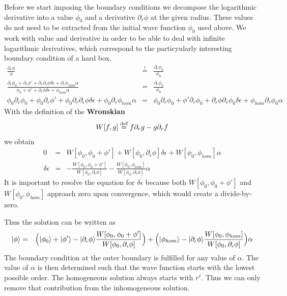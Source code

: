 \documentclass[11pt,a4paper]{report}
\begin{document}
Before we start imposing the boundary conditions we decompose the
logarithmic derivative into a value $\phi_0$ and a derivative
$\partial_r\phi$ at the given radius. These values do not need to be
extracted from the initial wave function $\phi_0$ used above. We work
with value and derivative in order to be able to deal with infinite
logarithmic derivatives, which correspond to the particyularly
interesting boundary condition of a hard box.
\begin{eqnarray*}
\frac{\partial_r\phi}{\phi}&\stackrel{!}{=}&\frac{\partial_r\phi_0}{\phi_0}
\\
\frac{\partial_r\phi_0+\partial_r\phi\prime
+\partial_r\partial_\epsilon\phi\delta\epsilon
+\partial_r\phi_{hom}\alpha}
{\phi_0+\phi\prime+\partial_\epsilon\phi\delta\epsilon+\phi_{hom}\alpha}
&=&\frac{\partial_r\phi_0}{\phi_0}
\\
\phi_0\partial_r\phi_0+\phi_0\partial_r\phi\prime
+\phi_0\partial_r\partial_\epsilon\phi\delta\epsilon
+\phi_0\partial_r\phi_{hom}\alpha
&=&
\phi_0\partial_r\phi_0+\phi\prime\partial_r\phi_0
+\partial_\epsilon\phi\partial_r\phi_0\delta\epsilon+\phi_{hom}\partial_r\phi_0 \alpha
\end{eqnarray*}
With the definition of the \textbf{Wronskian}
\begin{eqnarray*}
W[f,g]\stackrel{\text{def}}{=} f\partial_r g-g\partial_r f
\end{eqnarray*}
we obtain
\begin{eqnarray*}
0&=&W[\phi_0,\phi_0+\phi']
+W[\phi_0,\partial_\epsilon\phi]\delta \epsilon
+W[\phi_0,\phi_{hom}]\alpha
\\
\delta\epsilon&=&
-\frac{W[\phi_0,\phi_0+\phi']}{W[\phi_0,\partial_\epsilon\phi]}
-\frac{W[\phi_0,\phi_{hom}]}{W[\phi_0,\partial_\epsilon\phi]}\alpha
\end{eqnarray*}
It is important to resolve the equation for $\delta\epsilon$ because
both $W[\phi_0,\phi_0+\phi']$ and $W[\phi_0,\phi_{hom}]$ approach zero
upon convergence, which would create a divide-by-zero.

Thus the solution can be written as
\begin{eqnarray*}
|\phi\rangle&=&
\Bigl(|\phi_0\rangle+|\phi'\rangle-|\partial_\epsilon\phi\rangle
\frac{W[\phi_0,\phi_0+\phi']}{W[\phi_0,\partial_\epsilon\phi]}\Bigr)
+\Bigl(|\phi_{hom}\rangle-|\partial_\epsilon\phi\rangle
\frac{W[\phi_0,\phi_{hom}]}{W[\phi_0,\partial_\epsilon\phi]}\Bigr)\alpha
\end{eqnarray*}
The boundary condition at the outer boundary is fulfilled for any
value of $\alpha$. The value of $\alpha$ is then determined such that
the wave function starts with the lowest possible order. The
homogeneous solution always starts with $r^\ell$. Thus we can only
remove that contribution from the inhomogeneous solution.
\end{document}
